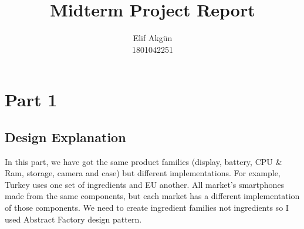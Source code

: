 \documentclass[twoside,11pt]{article}
\newcommand\studentName{Elif Akgün}                  %
\newcommand\studentNumber{1801042251}                %
\begin{document}
    
    \title{Midterm Project Report\assignmentNumber}
    
    \author{\name \studentName \email \studentEmail \\
    \studentNumber
    \addr
    }
    
    \maketitle

\section{Part 1} 
\label{sec:background}

\subsection{Design Explanation}

In this part, we have got the same product families (display, battery, CPU \& Ram, storage, camera and case) but different implementations. For example, Turkey uses one set of ingredients and EU another. All market's smartphones made from the same components, but each market has a different implementation of those components. We need to create ingredient families not ingredients so I used Abstract Factory design pattern. \newline
\end{document}
